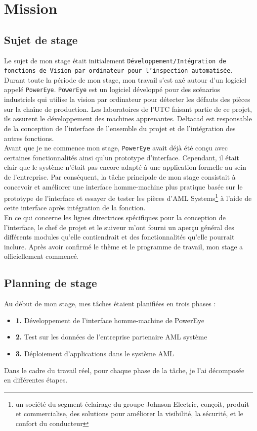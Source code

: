\chapter{Mission}
\section{Sujet de stage}
Le sujet de mon stage était initialement \texttt{Développement/Intégration de fonctions de Vision par ordinateur pour l’inspection automatisée}. Durant toute la période de mon stage, mon travail s'est axé autour d'un logiciel appelé \texttt{PowerEye}. \texttt{PowerEye} est un logiciel développé pour des scénarios industriels qui utilise la vision par ordinateur pour détecter les défauts des pièces sur la chaîne de production. Les laboratoires de l’UTC faisant partie de ce projet, ils assurent le développement des machines apprenantes. Deltacad est responsable de la conception de l'interface de l'ensemble du projet et de l'intégration des autres fonctions. \\

Avant que je ne commence mon stage, \texttt{PowerEye} avait déjà été conçu avec certaines fonctionnalités ainsi qu'un prototype d'interface. Cependant, il était clair que le système n'était pas encore adapté à une application formelle au sein de l'entreprise. Par conséquent, la tâche principale de mon stage consistait à concevoir et améliorer une interface homme-machine plus pratique basée sur le prototype de l'interface et essayer de tester les pièces d'AML Systems\footnote{un société du segment éclairage du groupe Johnson Electric, conçoit, produit et commercialise, des solutions pour améliorer la visibilité, la sécurité, et le confort du conducteur} à l'aide de cette interface après intégration de la fonction.\\

En ce qui concerne les lignes directrices spécifiques pour la conception de l'interface, le chef de projet et le suiveur m'ont fourni un aperçu général des différents modules qu'elle contiendrait et des fonctionnalités qu'elle pourrait inclure. Après avoir confirmé le thème et le programme de travail, mon stage a officiellement commencé.\\

\newpage
\section{Planning de stage}
Au début de mon stage, mes tâches étaient planifiées en trois phases : 
\begin{itemize}
    \item \textbf{1. }Développement de l'interface homme-machine de PowerEye 
    \item \textbf{2. }Test sur les données de l'entreprise partenaire AML système
    \item \textbf{3. }Déploiement d'applications dans le système AML
\end{itemize}

Dans le cadre du travail réel, pour chaque phase de la tâche, je l'ai décomposée en différentes étapes. 
